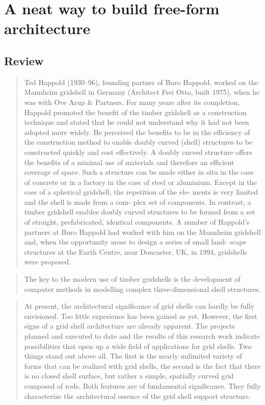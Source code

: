 
\chapter{A neat way to build free-form architecture}
%

\section{Review}

\blockcquote[][p.~2]{Harris2003}{Ted Happold (1930–96), founding partner of Buro Happold, worked on the Mannheim gridshell in Germany (Architect Frei Otto, built 1975), when he was with Ove Arup \& Partners. For many years after its completion, Happold promoted the benefit of the timber gridshell as a construction technique and stated that he could not understand why it had not been adopted more widely. He perceived the benefits to be in the efficiency of the construction method to enable doubly curved (shell) structures to be constructed quickly and cost effectively. A doubly curved structure offers the benefits of a minimal use of materials and therefore an efficient coverage of space. Such a structure can be made either in situ in the case of concrete or in a factory in the case of steel or aluminium. Except in the case of a spherical gridshell, the repetition of the ele- ments is very limited and the shell is made from a com- plex set of components. In contrast, a timber gridshell enables doubly curved structures to be formed from a set of straight, prefabricated, identical components. A number of Happold’s partners at Buro Happold had worked with him on the Mannheim gridshell and, when the opportunity arose to design a series of small land- scape structures at the Earth Centre, near Doncaster, UK, in 1994, gridshells were proposed.}

\blockcquote[][p.~2]{Harris2003}{The key to the modern use of timber gridshells is the development of computer methods in modelling complex three-dimensional shell structures. }

\blockcquote[][p.~250]{IL10}{At present, the architectural significance of grid shells can hardly be fully envisioned. Too little experience has been gained as yet. However, the first signs of a grid shell architecture are already apparent. The projects planned and executed to date and the results of this research work indicate possibilities that open up a wide field of applications for grid shells. Two things stand out above all. The first is the nearly unlimited variety of forms that can be realized with grid shells, the second is the fact that there is no closed shell surface, but rather a simple, spatially curved grid composed of rods. Both features are of fundamental significance. They fully characterize the architectural essence of the grid shell support structure.}
\clearpage

